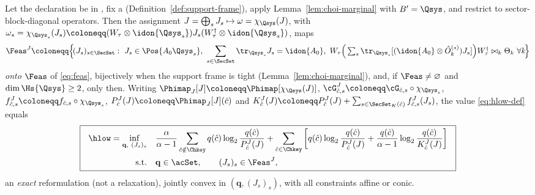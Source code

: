 \begin{theorem}\label{thm:choi}
Let the declaration be in , fix a
 (Definition~\ref{def:support-frame}), apply
Lemma~\ref{lem:choi-marginal} with $B'=\Qsys$, and restrict to
sector-block-diagonal operators. Then the assignment
$J=\bigoplus_{s}J_s\mapsto\omega=\chi_{\Qsys}(J)$, with
$\omega_s=\chi_{\Qsys_s}(J_s)\coloneqq
(W_{\tau}\otimes\idon{\Qsys_s})J_s(W_{\tau}^{\dagger}\otimes\idon{\Qsys_s})$,
maps
\begin{equation}\label{eq:choi-feas}
  \Feas^{J}\coloneqq\Big\{\!(J_s)_{s\in\SecSet}:\ J_s\in\Pos{A_0\Qsys_s},\
  \sum_{s\in\SecSet}\tr_{\Qsys_s}J_s=\idon{A_0},\
  W_{\tau}\Big(\textstyle\sum_s
  \tr_{\Qsys_s}[(\idon{A_0}\otimes\hat O^{(s)}_k)J_s]\Big)
  W_{\tau}^{\dagger}\bowtie_k\Theta_k\ \forall k\!\Big\}
\end{equation}
\emph{onto} $\Feas$ of \eqref{eq:feas}, bijectively when the support frame
is tight (Lemma~\ref{lem:choi-marginal}), and, if $\Feas\ne\varnothing$ and
$\dim\Hs{\Qsys}\ge2$, only then. Writing
$\Phimap_{J}[J]\coloneqq\Phimap[\chi_{\Qsys}(J)]$,
$\cG^{J}_{\hat c,s}\coloneqq\cG_{\hat c,s}\circ\chi_{\Qsys_s}$,
$f^{J}_{\hat c,s}\coloneqq f_{\hat c,s}\circ\chi_{\Qsys_s}$,
$P^{J}_{\hat c}(J)\coloneqq\Phimap_J[J](\hat c)$ and
$K^{J}_{\hat c}(J)\coloneqq P^{J}_{\hat c}(J)
+\sum_{s\in\SecSet_K(\hat c)}f^{J}_{\hat c,s}(J_s)$, the value
\eqref{eq:hlow-def} equals
\begin{equation}\label{eq:choi-program}
\boxed{\ \
\begin{aligned}
  \hlow=\inf_{\mathbf q,\ (J_s)_s}\quad
  &\frac{\alpha}{\alpha-1}\sum_{\hat c\notin\Chkey}
  q(\hat c)\log_2\frac{q(\hat c)}{P^{J}_{\hat c}(J)}
  +\sum_{\hat c\in\Chkey}\left[
  q(\hat c)\log_2\frac{q(\hat c)}{P^{J}_{\hat c}(J)}
  +\frac{q(\hat c)}{\alpha-1}
  \log_2\frac{q(\hat c)}{K^{J}_{\hat c}(J)}\right]\\
  \text{s.t.}\quad
  &\mathbf q\in\acSet,\qquad (J_s)_s\in\Feas^{J},
\end{aligned}\ \ }
\end{equation}
an \emph{exact} reformulation (not a relaxation), jointly convex in
$(\mathbf q,(J_s)_s)$, with all constraints affine or conic.


\end{theorem}
